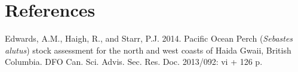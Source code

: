 \documentclass[12pt]{article}\usepackage[]{graphicx}\usepackage[]{color}
\begin{document}
\clearpage

\hypertarget{references}{%
\section{References}\label{references}}

\hypertarget{refs}{}
\leavevmode\hypertarget{ref-edwards2013}{}%
Edwards, A.M., Haigh, R., and Starr, P.J. 2014. Pacific Ocean Perch (\emph{Sebastes alutus}) stock assessment for the north and west coasts of Haida Gwaii, British Columbia. DFO Can. Sci. Advis. Sec. Res. Doc. 2013/092: vi + 126 p.
\end{document}
